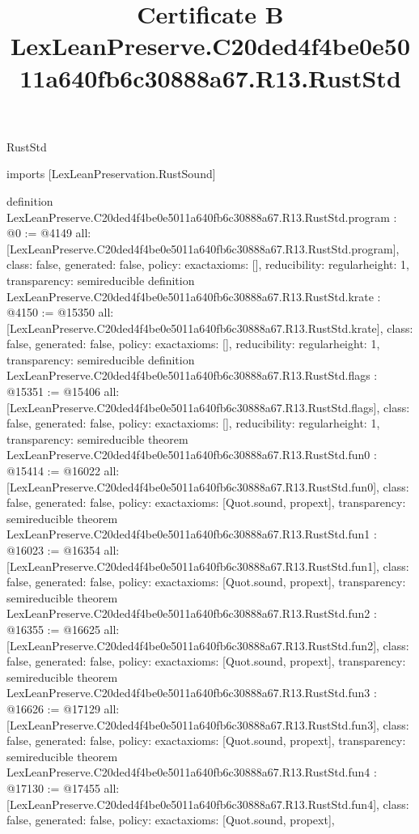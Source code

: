 \begin{lexlean}{RustStd}
\title{Certificate B LexLeanPreserve.C20ded4f4be0e5011a640fb6c30888a67.R13.RustStd}
\begin{coremodule}
imports [LexLeanPreservation.RustSound]

definition LexLeanPreserve.C20ded4f4be0e5011a640fb6c30888a67.R13.RustStd.program : @0 := @4149 {
  all: [LexLeanPreserve.C20ded4f4be0e5011a640fb6c30888a67.R13.RustStd.program],
  class: false,
  generated: false,
  policy: exact{axioms: []},
  reducibility: regular{height: 1},
  transparency: semireducible
}
definition LexLeanPreserve.C20ded4f4be0e5011a640fb6c30888a67.R13.RustStd.krate : @4150 := @15350 {
  all: [LexLeanPreserve.C20ded4f4be0e5011a640fb6c30888a67.R13.RustStd.krate],
  class: false,
  generated: false,
  policy: exact{axioms: []},
  reducibility: regular{height: 1},
  transparency: semireducible
}
definition LexLeanPreserve.C20ded4f4be0e5011a640fb6c30888a67.R13.RustStd.flags : @15351 := @15406 {
  all: [LexLeanPreserve.C20ded4f4be0e5011a640fb6c30888a67.R13.RustStd.flags],
  class: false,
  generated: false,
  policy: exact{axioms: []},
  reducibility: regular{height: 1},
  transparency: semireducible
}
theorem LexLeanPreserve.C20ded4f4be0e5011a640fb6c30888a67.R13.RustStd.fun0 : @15414 := @16022 {
  all: [LexLeanPreserve.C20ded4f4be0e5011a640fb6c30888a67.R13.RustStd.fun0],
  class: false,
  generated: false,
  policy: exact{axioms: [Quot.sound, propext]},
  transparency: semireducible
}
theorem LexLeanPreserve.C20ded4f4be0e5011a640fb6c30888a67.R13.RustStd.fun1 : @16023 := @16354 {
  all: [LexLeanPreserve.C20ded4f4be0e5011a640fb6c30888a67.R13.RustStd.fun1],
  class: false,
  generated: false,
  policy: exact{axioms: [Quot.sound, propext]},
  transparency: semireducible
}
theorem LexLeanPreserve.C20ded4f4be0e5011a640fb6c30888a67.R13.RustStd.fun2 : @16355 := @16625 {
  all: [LexLeanPreserve.C20ded4f4be0e5011a640fb6c30888a67.R13.RustStd.fun2],
  class: false,
  generated: false,
  policy: exact{axioms: [Quot.sound, propext]},
  transparency: semireducible
}
theorem LexLeanPreserve.C20ded4f4be0e5011a640fb6c30888a67.R13.RustStd.fun3 : @16626 := @17129 {
  all: [LexLeanPreserve.C20ded4f4be0e5011a640fb6c30888a67.R13.RustStd.fun3],
  class: false,
  generated: false,
  policy: exact{axioms: [Quot.sound, propext]},
  transparency: semireducible
}
theorem LexLeanPreserve.C20ded4f4be0e5011a640fb6c30888a67.R13.RustStd.fun4 : @17130 := @17455 {
  all: [LexLeanPreserve.C20ded4f4be0e5011a640fb6c30888a67.R13.RustStd.fun4],
  class: false,
  generated: false,
  policy: exact{axioms: [Quot.sound, propext]},
}
\end{coremodule}
\end{lexlean}
